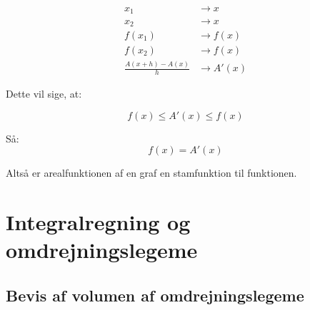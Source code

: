 \documentclass{article}
\makeatletter
\newenvironment{proofw}{\par
  \pushQED{\qed}%
  \normalfont \topsep6\p@\@plus6\p@\relax
  \trivlist
  \item[]\ignorespaces
}{%
  \popQED\endtrivlist\@endpefalse
}
\makeatother
\begin{document}
\begin{proofw}
\begin{align*}
    x_1 &\rightarrow x \\
    x_2 &\rightarrow x \\
    f(x_1) &\rightarrow f(x) \\
    f(x_2) &\rightarrow f(x) \\
    \frac{A(x+h)-A(x)}{h} &\rightarrow A'(x)
\end{align*}

Dette vil sige, at:

$$
    f(x) \leq A'(x) \leq f(x)
$$

Så:
$$
    f(x) = A'(x)
$$

Altså er arealfunktionen af en graf en stamfunktion til funktionen.

\end{proofw}

\section{Integralregning og omdrejningslegeme}

\subsection{Bevis af volumen af omdrejningslegeme}
\end{document}
